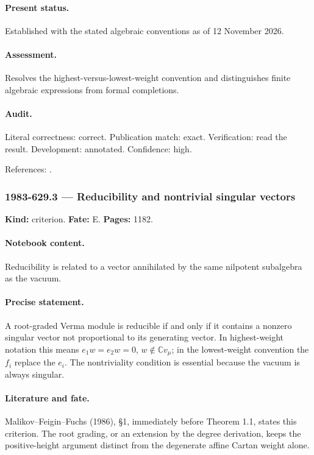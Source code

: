 \paragraph{Present status.} Established with the stated algebraic conventions as of 12 November 2026.

\paragraph{Assessment.} Resolves the highest-versus-lowest-weight convention and distinguishes finite algebraic expressions from formal completions.

\paragraph{Audit.} Literal correctness: correct. Publication match: exact. Verification: read the result. Development: annotated. Confidence: high.

\noindent References: \citep{malikovfeiginfuchs1986singular}.\par

\subsubsection{1983-629.3 --- Reducibility and nontrivial singular vectors}

\label{item:1983-629.3}

\noindent\textbf{Kind:} criterion. \textbf{Fate:} E. \textbf{Pages:} 1182.\par

\paragraph{Notebook content.} Reducibility is related to a vector annihilated by the same nilpotent subalgebra as the vacuum.

\paragraph{Precise statement.} A root-graded Verma module is reducible if and only if it contains a nonzero singular vector not proportional to its generating vector. In highest-weight notation this means \(e_1w=e_2w=0\), \(w\notin\mathbb Cv_\mu\); in the lowest-weight convention the \(f_i\) replace the \(e_i\). The nontriviality condition is essential because the vacuum is always singular.

\paragraph{Literature and fate.} Malikov–Feigin–Fuchs (1986), \S1, immediately before Theorem 1.1, states this criterion. The root grading, or an extension by the degree derivation, keeps the positive-height argument distinct from the degenerate affine Cartan weight alone.

